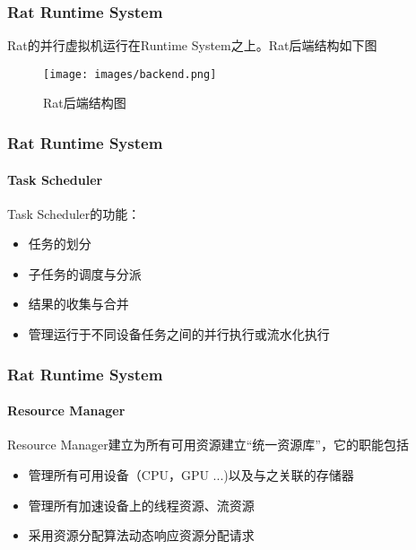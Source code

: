 \documentclass{beamer}
\begin{document}
\begin{frame}
  \frametitle{Rat Runtime System}
  Rat的并行虚拟机运行在Runtime System之上。Rat后端结构如下图
  \begin{figure}
    \caption{Rat后端结构图}
    \texttt{[image: images/backend.png]}
  \end{figure}
\end{frame}

\begin{frame}
  \frametitle{Rat Runtime System}
  \framesubtitle{Task Scheduler}
  Task Scheduler的功能：
  \begin{itemize}
    \item 任务的划分
    \item 子任务的调度与分派
    \item 结果的收集与合并
    \item 管理运行于不同设备任务之间的并行执行或流水化执行
  \end{itemize}
\end{frame}

\begin{frame}
  \frametitle{Rat Runtime System}
  \framesubtitle{Resource Manager}
  Resource Manager建立为所有可用资源建立“统一资源库”，它的职能包括    
  \begin{itemize}
    \item 管理所有可用设备（CPU，GPU ...)以及与之关联的存储器
    \item 管理所有加速设备上的线程资源、流资源
    \item 采用资源分配算法动态响应资源分配请求
  \end{itemize}
\end{frame}

\end{document}
